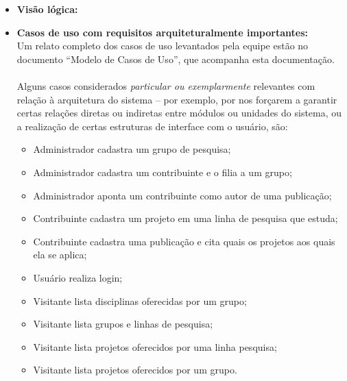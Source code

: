 \documentclass[11pt, a4paper]{article}
\begin{document}
        \begin{itemize}
            \item \textbf{Visão lógica:}
                \\

            
            \item \textbf{Casos de uso com requisitos arquiteturalmente
            importantes:}
                \\
                Um relato completo dos casos de uso levantados pela equipe
                estão no documento ``Modelo de Casos de Uso'', que acompanha
                esta documentação.
                \\\\
                Alguns casos considerados \textit{particular ou exemplarmente}
                relevantes com relação à arquitetura do sistema -- por exemplo,
                por nos forçarem a garantir certas relações diretas ou
                indiretas entre módulos ou unidades do sistema, ou a realização
                de certas estruturas de interface com o usuário, são:
                \begin{itemize}
                    \item Administrador cadastra um grupo de pesquisa;
                    
                    \item Administrador cadastra um contribuinte e o filia a
                    um grupo;
                    
                    \item Administrador aponta um contribuinte como autor de
                    uma publicação;
                    
                    \item Contribuinte cadastra um projeto em uma linha de
                    pesquisa que estuda;
                    
                    \item Contribuinte cadastra uma publicação e cita quais
                    os projetos aos quais ela se aplica;

                    \item Usuário realiza login;
                    
                    \item Visitante lista disciplinas oferecidas por um grupo;
                    
                    \item Visitante lista grupos e linhas de pesquisa;
                    
                    \item Visitante lista projetos oferecidos por uma linha
                    pesquisa;
                    
                    \item Visitante lista projetos oferecidos por um grupo.
                    
                \end{itemize}
        \end{itemize}
\end{document}
